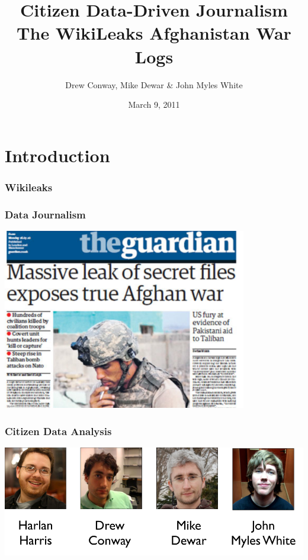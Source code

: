 \documentclass[xcolor=dvipsnames, 9pt]{beamer}
\title{Citizen Data-Driven Journalism\\The WikiLeaks Afghanistan War Logs}
\author{Drew Conway, Mike Dewar \& John Myles White}
\date{March 9, 2011}
\begin{document}
    
\ifpdf
{}
\else
{}
\fi
\graphicspath{{images/}}

\begin{frame}[plain]
  \titlepage  
\end{frame}



\section{Introduction}

\begin{frame}
	\frametitle{Wikileaks}
	\begin{center}
    \end{center}
\end{frame}

\begin{frame}
    \frametitle{Data Journalism}
    \begin{center}
    \includegraphics[width=0.8\textwidth]{guardian.png}
    \end{center}
\end{frame}

\begin{frame}
    \frametitle{Citizen Data Analysis}
    \begin{center}
    \includegraphics[width=\textwidth]{hackademics.png}
    \end{center}
\end{frame}
\end{document}
